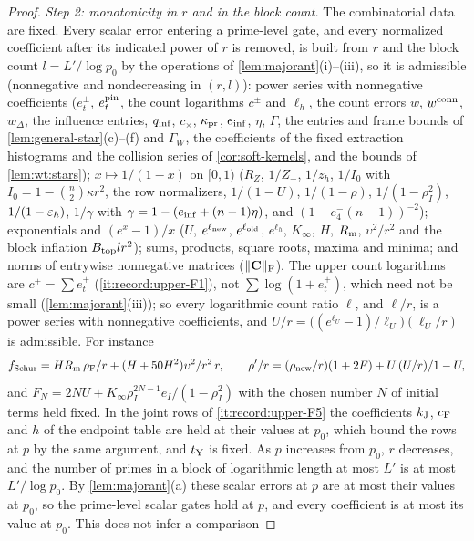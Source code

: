 \begin{proof}
\emph{Step 2: monotonicity in $r$ and in the block count.} The combinatorial
data are fixed. Every scalar error entering a prime-level gate, and every normalized coefficient after
its indicated power of $r$ is removed, is built from $r$ and the block count
$l=L'/\log p_0$ by the operations of \cref{lem:majorant}(i)--(iii), so it is
admissible (nonnegative and nondecreasing in $(r,l)$): power series with
nonnegative coefficients ($e^\pm_t$, $e^{\rm pin}_t$, the count logarithms $c^\pm$
and $\ell_h$, the count errors $w$, $w^{\rm conn}$, $w_\Delta$, the influence
entries, $q_{\rm inf}$, $c_\times$, $\kappa_{\rm pr}$, $e_{\rm inf}$, $\eta$, $\Gamma$,
the entries and frame bounds of \cref{lem:general-star}(c)--(f) and $\Gamma_W$, the
coefficients of the fixed extraction histograms and the collision series of
\cref{cor:soft-kernels}, and the bounds of \cref{lem:wt:stars}); $x\mapsto1/(1-x)$ on
$[0,1)$ ($R_Z$, $1/Z_-$, $1/z_h$, $1/I_0$ with $I_0=1-\binom n2\kappa r^2$, the row
normalizers, $1/(1-U)$, $1/(1-\rho)$, $1/(1-\rho_I^2)$, $1/(1-\eps_h)$, $1/\gamma$
with $\gamma=1-(e_{\rm inf}+(n-1)\eta)$, and $(1-e^-_4(n-1))^{-2}$); exponentials and
$(e^x-1)/x$ ($U$, $e^{\ell_{\rm new}}$, $e^{\ell_{\rm old}}$, $e^{\ell_h}$, $K_\infty$,
$H$, $R_{\rm m}$, $\upsilon^2/r^2$ and the block inflation $B_{\rm top}lr^2$); sums,
products, square roots, maxima and minima; and norms of entrywise nonnegative
matrices ($\|\mathbf C\|_{\rm F}$). The upper count logarithms are
$c^+=\sum e^+_t$ (\ref{it:record:upper-F1}), not $\sum\log(1+e^+_t)$, which need
not be small (\cref{lem:majorant}(iii)); so every logarithmic count ratio
$\ell$, and $\ell/r$, is a power series with nonnegative coefficients, and
$U/r=\bigl((e^{\ell_U}-1)/\ell_U\bigr)(\ell_U/r)$ is admissible. For instance
\[
 f_{\rm Schur}=HR_{\rm m}\,\frac{\rho_{\rm F}}r+(H+50H^2)\frac{\upsilon^2}{r^2}\,r,\qquad
 \frac{\rho'}r=\frac{(\rho_{\rm new}/r)(1+2F)+U\,(U/r)}{1-U},
\]
and $F_N=2NU+K_\infty\rho_I^{2N-1}e_I/(1-\rho_I^2)$ with the chosen number $N$ of
initial terms held fixed. In the joint rows of \ref{it:record:upper-F5} the
coefficients $k_{\rm J}$, $c_{\rm F}$ and $h$ of the endpoint table are held at their
values at $p_0$, which bound the rows at $p$ by the same argument, and $t_{\rm Y}$ is
fixed. As $p$ increases from $p_0$, $r$
decreases, and the number of primes in a block of logarithmic length at most $L'$ is
at most $L'/\log p_0$. By \cref{lem:majorant}(a) these scalar errors at $p$ are at most
their values at $p_0$, so the prime-level scalar gates hold at $p$, and every
coefficient is at most its value at $p_0$. This does not infer a comparison

\end{proof}
